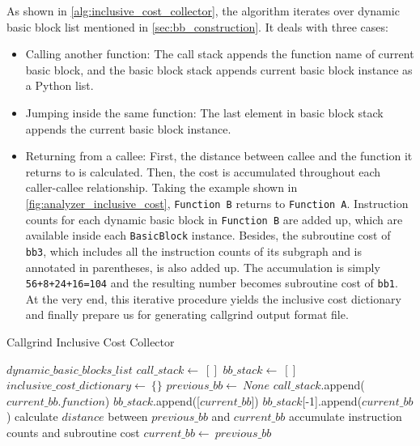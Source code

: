 As shown in \cref{alg:inclusive_cost_collector}, the algorithm iterates over dynamic basic block list mentioned in \cref{sec:bb_construction}. It deals with three cases:

\begin{itemize}
    \item Calling another function: The call stack appends the function name of current basic block, and the basic block stack appends current basic block instance as a Python list.
    \item Jumping inside the same function: The last element in basic block stack appends the current basic block instance.
    \item Returning from a callee: First, the distance between callee and the function it returns to is calculated. Then, the cost is accumulated throughout each caller-callee relationship. Taking the example shown in \cref{fig:analyzer_inclusive_cost}, \texttt{Function B} returns to \texttt{Function A}. Instruction counts for each dynamic basic block in \texttt{Function B} are added up, which are available inside each \texttt{BasicBlock} instance. Besides, the subroutine cost of \texttt{bb3}, which includes all the instruction counts of its subgraph and is annotated in parentheses, is also added up. The accumulation is simply \texttt{56+8+24+16=104} and the resulting number becomes subroutine cost of \texttt{bb1}. At the very end, this iterative procedure yields the inclusive cost dictionary and finally prepare us for generating callgrind output format file. 
\end{itemize}

\medskip
\begin{algorithm}
\caption{Callgrind Inclusive Cost Collector}
\label{alg:inclusive_cost_collector}
\begin{algorithmic}
\REQUIRE $dynamic\_basic\_blocks\_list$
\STATE $call\_stack \gets\ []$
\STATE $bb\_stack \gets\ []$
\STATE $inclusive\_cost\_dictionary \gets\ \{\}$
\STATE $previous\_bb \gets\ None$
        \STATE $call\_stack$.append($current\_bb.function$)
        \STATE $bb\_stack$.append([$current\_bb$])
        \STATE $bb\_stack$[-1].append($current\_bb$)
        \STATE calculate $distance$ between $previous\_bb$ and $current\_bb$
            \STATE accumulate instruction counts and subroutine cost
        \ENDFOR
    \ENDIF
    \STATE $current\_bb \gets\ previous\_bb$
\ENDFOR
\end{algorithmic}
\end{algorithm}
\medskip

